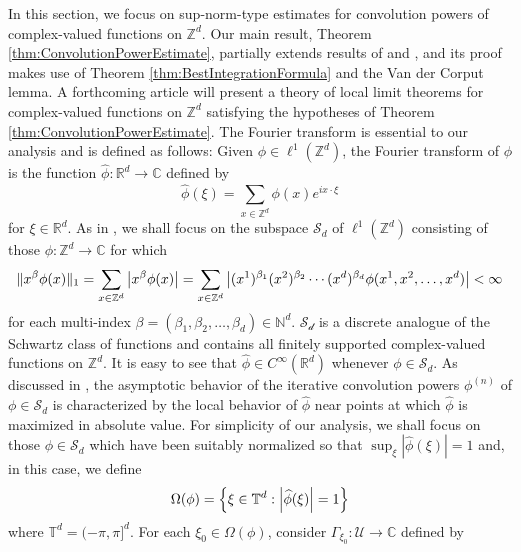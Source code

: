 \documentclass[11pt, letter]{book}
\begin{document}
\noindent In this section, we focus on sup-norm-type estimates for convolution powers of complex-valued functions on $\mathbb{Z}^d$. Our main result, Theorem \ref{thm:ConvolutionPowerEstimate}, partially extends results of \cite{randles_convolution_2015} and \cite{randles_convolution_2017}, and its proof makes use of Theorem \ref{thm:BestIntegrationFormula} and the Van der Corput lemma. A forthcoming article will present a theory of local limit theorems for complex-valued functions on $\mathbb{Z}^d$ satisfying the hypotheses of Theorem \ref{thm:ConvolutionPowerEstimate}. The Fourier transform is essential to our analysis and is defined as follows: Given $\phi\in\ell^1(\mathbb{Z}^d)$, the Fourier transform of $\phi$ is the function $\widehat{\phi}:\mathbb{R}^d\to\mathbb{C}$ defined by
\begin{equation*}
    \widehat{\phi}(\xi)=\sum_{x\in\mathbb{Z}^d}\phi(x)e^{ix\cdot\xi}
\end{equation*}
for $\xi\in\mathbb{R}^d$. As in \cite{randles_convolution_2017}, we shall focus on the subspace $\mathcal{S}_d$ of $\ell^1(\mathbb{Z}^d)$ consisting of those $\phi:\mathbb{Z}^d\to\mathbb{C}$ for which
\begin{equation*}
    \|x^\beta \phi(x)\|_1=\sum_{x\in\mathbb{Z}^d}\abs{x^\beta\phi(x)}=\sum_{x\in\mathbb{Z}^d}\abs{(x^1)^{\beta_1}(x^2)^{\beta_2}\cdots(x^d)^{\beta_d}\phi(x^1,x^2,\dots,x^d)}<\infty
\end{equation*}
for each multi-index $\beta=(\beta_1,\beta_2,\dots,\beta_d)\in\mathbb{N}^d$. $\mathcal{S_d}$ is a discrete analogue of the Schwartz class of functions and contains all finitely supported complex-valued functions on $\mathbb{Z}^d$.  It is easy to see that $\widehat{\phi}\in C^\infty(\mathbb{R}^d)$ whenever $\phi\in \mathcal{S}_d$. As discussed in \cite{thomee_stability_1965,diaconis_convolution_2014,randles_convolution_2015,randles_convolution_2017}, the asymptotic behavior of the iterative convolution powers $\phi^{(n)}$ of $\phi\in\mathcal{S}_d$ is characterized by the local behavior of $\widehat{\phi}$ near points at which $\widehat{\phi}$ is maximized in absolute value. For simplicity of our analysis, we shall focus on those $\phi\in\mathcal{S}_d$ which have been suitably normalized so that $\sup_{\xi}|\widehat{\phi}(\xi)|=1$ and, in this case, we define
\begin{equation*}
    \Omega(\phi)=\left\{\xi\in \mathbb{T}^d:\abs{\widehat{\phi}(\xi)}=1\right\}
\end{equation*}
where $\mathbb{T}^d=(-\pi,\pi]^d$. For each $\xi_0\in \Omega(\phi)$, consider $\Gamma_{\xi_0}:\mathcal{U}\to\mathbb{C}$ defined by
\end{document}
